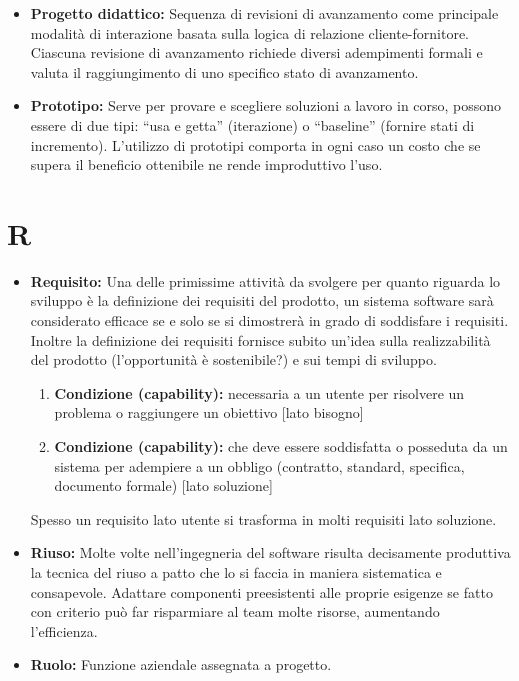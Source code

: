 \documentclass[a4paper]{article}
\begin{document}
\begin{itemize}
\begin{itemize}
			\end{itemize}
			\item \textbf{Progetto didattico:} Sequenza di revisioni di avanzamento come principale modalità di interazione basata 
			sulla logica di relazione cliente-fornitore. Ciascuna revisione di avanzamento richiede diversi adempimenti formali e 
			valuta il raggiungimento di uno specifico stato di avanzamento.
			\item \textbf{Prototipo:} Serve per provare e scegliere soluzioni a lavoro in corso, possono essere di due tipi: “usa e getta” 
			(iterazione) o “baseline” (fornire stati di incremento). L’utilizzo di prototipi comporta in ogni caso un costo che se supera 
			il beneficio ottenibile ne rende improduttivo l’uso.
		\end{itemize}
		
	\section*{R}
		\begin{itemize}
			\item \textbf{Requisito:}  Una delle primissime attività da svolgere per quanto riguarda lo sviluppo è la 
			definizione dei requisiti del prodotto, un sistema software sarà considerato efficace se e solo se si dimostrerà 
			in grado di soddisfare i requisiti. Inoltre la definizione dei requisiti fornisce subito un’idea sulla realizzabilità 
			del prodotto (l'opportunità è sostenibile?) e sui tempi di sviluppo.
			\begin{enumerate}
				\item \textbf{Condizione (capability):} necessaria a un utente per risolvere un problema o raggiungere un obiettivo [lato bisogno]
				\item \textbf{Condizione (capability):} che deve essere soddisfatta o posseduta da un sistema per adempiere a un obbligo (contratto, 
			  standard, specifica, documento formale) [lato soluzione]
			\end{enumerate}
			Spesso un requisito lato utente si trasforma in molti requisiti lato soluzione.
			\item \textbf{Riuso:} Molte volte nell'ingegneria del software risulta decisamente produttiva la tecnica del riuso a patto che lo si faccia 
			in maniera sistematica e consapevole. Adattare componenti preesistenti alle proprie esigenze se fatto con criterio può far 
			risparmiare al team molte risorse, aumentando l'efficienza.
			\item \textbf{Ruolo:} Funzione aziendale assegnata a progetto.
		\end{itemize}
		
\end{document}
